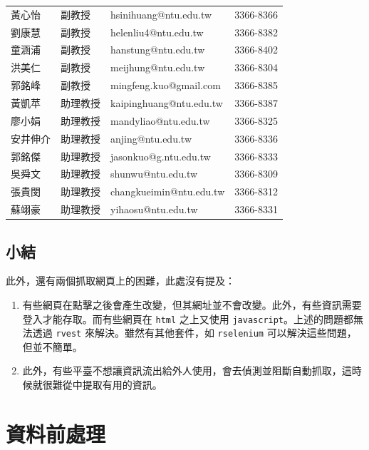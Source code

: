 \documentclass[
]{book}
\providecommand{\tightlist}{%
  \setlength{\itemsep}{0pt}\setlength{\parskip}{0pt}}
\theoremstyle{definition}
\theoremstyle{remark}
\begin{document}
\begin{table}
\begin{tabular}[t]{llll}
\addlinespace
黃心怡 & 副教授 & hsinihuang@ntu.edu.tw & 3366-8366\\
劉康慧 & 副教授 & helenliu4@ntu.edu.tw & 3366-8382\\
童涵浦 & 副教授 & hanstung@ntu.edu.tw & 3366-8402\\
洪美仁 & 副教授 & meijhung@ntu.edu.tw & 3366-8304\\
郭銘峰 & 副教授 & mingfeng.kuo@gmail.com & 3366-8385\\
\addlinespace
黃凱苹 & 助理教授 & kaipinghuang@ntu.edu.tw & 3366-8387\\
廖小娟 & 助理教授 & mandyliao@ntu.edu.tw & 3366-8325\\
安井伸介 & 助理教授 & anjing@ntu.edu.tw & 3366-8336\\
郭銘傑 & 助理教授 & jasonkuo@g.ntu.edu.tw & 3366-8333\\
吳舜文 & 助理教授 & shunwu@ntu.edu.tw & 3366-8309\\
\addlinespace
張貴閔 & 助理教授 & changkueimin@ntu.edu.tw & 3366-8312\\
蘇翊豪 & 助理教授 & yihaosu@ntu.edu.tw & 3366-8331\\
\bottomrule
\end{tabular}
\end{table}

\hypertarget{ux5c0fux7d50}{%
\section{小結}\label{ux5c0fux7d50}}

此外，還有兩個抓取網頁上的困難，此處沒有提及：

\begin{enumerate}
\def\labelenumi{\arabic{enumi}.}
\tightlist
\item
  有些網頁在點擊之後會產生改變，但其網址並不會改變。此外，有些資訊需要登入才能存取。而有些網頁在 \texttt{html} 之上又使用 \texttt{javascript}。上述的問題都無法透過 \texttt{rvest} 來解決。雖然有其他套件，如 \texttt{rselenium} 可以解決這些問題，但並不簡單。
\item
  此外，有些平臺不想讓資訊流出給外人使用，會去偵測並阻斷自動抓取，這時候就很難從中提取有用的資訊。
\end{enumerate}

\hypertarget{preprocessing}{%
\chapter{資料前處理}\label{preprocessing}}
\end{document}
